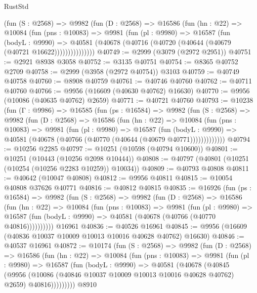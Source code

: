 \begin{lexlean}{RustStd}
\begin{coremodule}
          (fun (S : @2568) =>
          @9982
            (fun (D : @2568) =>
            @16586
              (fun (hn : @22) =>
              @10084
                (fun (pns : @10083) =>
                @9981
                  (fun (pl : @9980) =>
                  @16587
                    (fun (bodyL : @9990) =>
                    @40581 (@40678 (@40716 (@40720 (@40644 (@40679 (@40721 @16622)))))))))))))))
@40749 := @2999 (@3079 (@2972 @2951))
@40751 := @2921 @8938 @3058
@40752 := @3135 @40751
@40754 := @8365 @40752 @2709
@40758 := @2999 (@3958 (@2972 @40754)) @3103
@40759 := @40749 @40758
@40760 := @8908 @40759
@40761 := @40746 @40760
@40762 := @40711 @40760
@40766 := @9956 (@16609 (@40630 @40762) @16630)
@40770 := @9956 (@10086 (@40635 @40762) @2659)
@40771 := @40721 @40760
@40793 := @10238
    (fun (Γ : @9986) =>
    @16585
      (fun (ps : @16584) =>
      @9982
        (fun (S : @2568) =>
        @9982
          (fun (D : @2568) =>
          @16586
            (fun (hn : @22) =>
            @10084
              (fun (pns : @10083) =>
              @9981
                (fun (pl : @9980) =>
                @16587
                  (fun (bodyL : @9990) =>
                  @40581 (@40678 (@40766 (@40770 (@40644 (@40679 @40771)))))))))))))
@40794 := @10256 @2285
@40797 := @10251 (@10598 (@40794 @10600))
@40801 := @10251 (@10443 (@10256 @2098 @10444))
@40808 := @40797 (@40801 (@10251 (@10254 (@10256 @2283 @10259)) @10034))
@40809 := @40793 @40808
@40811 := @40642 (@10047 @40808)
@40812 := @9956 @40811
@40815 := @10054 @40808 @37626 @40771
@40816 := @40812 @40815
@40835 := @16926
    (fun (ps : @16584) =>
    @9982
      (fun (S : @2568) =>
      @9982
        (fun (D : @2568) =>
        @16586
          (fun (hn : @22) =>
          @10084
            (fun (pns : @10083) =>
            @9981
              (fun (pl : @9980) =>
              @16587 (fun (bodyL : @9990) => @40581 (@40678 (@40766 (@40770 @40816))))))))))
    @16961
@40836 := @40526 @16961
@40845 := @9956 (@16609 (@40836 @10037 @10009 @10013 @10016 @40628 @40762) @16630)
@40846 := @40537 @16961
@40872 := @10174
    (fun (S : @2568) =>
    @9982
      (fun (D : @2568) =>
      @16586
        (fun (hn : @22) =>
        @10084
          (fun (pns : @10083) =>
          @9981
            (fun (pl : @9980) =>
            @16587
              (fun (bodyL : @9990) =>
              @40581
                (@40678
                  (@40845
                    (@9956
                      (@10086 (@40846 @10037 @10009 @10013 @10016 @40628 @40762) @2659)
                      @40816)))))))))
    @8910

\end{coremodule}
\end{lexlean}

